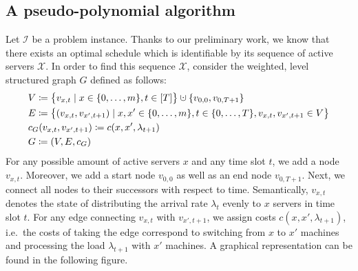\documentclass[hidelinks]{article}
\theoremstyle{plain}
\theoremstyle{definition}
\theoremstyle{rem}
\newcommand{\mx}{\mathcal{X}}
\newcommand{\inp}{\mathcal{I}}
\newcommand{\costs}{c}
\newcommand{\fromto}[2]{\{#1,\ldots,#2\}}
\newcommand{\dotcup}{\mathbin{\mathaccent\cdot\cup}}
\begin{document}
\subsection{A pseudo-polynomial algorithm}\label{sec_opt_offline_pseudo_poly}
Let $\inp$ be a problem instance. Thanks to our preliminary work, we know that there exists an optimal schedule which is identifiable by its sequence of active servers $\mx$. In order to find this sequence $\mx$, consider the weighted, level structured graph $G$ defined as follows:
\begin{align*}
	&V\coloneqq\bigl\{v_{x,t}\mid x\in\fromto{0}{m},t\in[T]\bigr\}\dotcup\{v_{0,0},v_{0,T+1}\}\\
	&E\coloneqq\bigl\{(v_{x,t},v_{x',t+1})\mid x,x'\in\fromto{0}{m},t\in\fromto{0}{T},v_{x,t},v_{x',t+1}\in V\bigr\}\\
	&c_G(v_{x,t},v_{x',t+1})\coloneqq\costs(x,x',\lambda_{t+1})\\
	&G\coloneqq(V,E,c_G)
\end{align*}
For any possible amount of active servers $x$ and any time slot $t$, we add a node $v_{x,t}$. Moreover, we add a start node $v_{0,0}$ as well as an end node $v_{0,T+1}$. Next, we connect all nodes to their successors with respect to time. Semantically, $v_{x,t}$ denotes the state of distributing the arrival rate $\lambda_{t}$ evenly to $x$ servers in time slot $t$. For any edge connecting $v_{x,t}$ with $v_{x',t+1}$, we assign costs $\costs(x,x',\lambda_{t+1})$, i.e.\ the costs of taking the edge correspond to switching from $x$ to $x'$ machines and processing the load $\lambda_{t+1}$ with $x'$ machines. A graphical representation can be found in the following figure.
\end{document}
